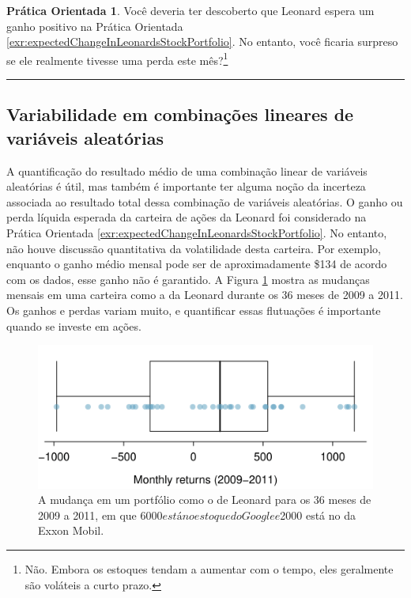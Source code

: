 \documentclass[
]{book}
\theoremstyle{definition}
\theoremstyle{definition}
\theoremstyle{definition}
\newtheorem{exercise}{Prática Orientada}[chapter]
\theoremstyle{definition}
\theoremstyle{remark}
\begin{document}
\begin{exercise}
\protect\hypertarget{exr:unnamed-chunk-80}{}{\label{exr:unnamed-chunk-80} }Você deveria ter descoberto que Leonard espera um ganho positivo na Prática Orientada \ref{exr:expectedChangeInLeonardsStockPortfolio}. No entanto, você ficaria surpreso se ele realmente tivesse uma perda este mês?\footnote{Não. Embora os estoques tendam a aumentar com o tempo, eles geralmente são voláteis a curto prazo.}
\end{exercise}

\begin{center}\rule{0.5\linewidth}{0.5pt}\end{center}

\hypertarget{variabilityLinearCombinationRandomVariables}{%
\subsection{Variabilidade em combinações lineares de variáveis aleatórias}\label{variabilityLinearCombinationRandomVariables}}

A quantificação do resultado médio de uma combinação linear de variáveis aleatórias é útil, mas também é importante ter alguma noção da incerteza associada ao resultado total dessa combinação de variáveis aleatórias. O ganho ou perda líquida esperada da carteira de ações da Leonard foi considerado na Prática Orientada \ref{exr:expectedChangeInLeonardsStockPortfolio}. No entanto, não houve discussão quantitativa da volatilidade desta carteira. Por exemplo, enquanto o ganho médio mensal pode ser de aproximadamente \$134 de acordo com os dados, esse ganho não é garantido. A Figura \ref{fig:changeInLeonardsStockPortfolioFor36Months} mostra as mudanças mensais em uma carteira como a da Leonard durante os 36 meses de 2009 a 2011. Os ganhos e perdas variam muito, e quantificar essas flutuações é importante quando se investe em ações.

\begin{figure}
\includegraphics[width=1\linewidth]{images/c2/changeInLeonardsStockPortfolioFor36Months} \caption{A mudança em um portfólio como o de Leonard para os 36 meses de 2009 a 2011, em que $6000 está no estoque do Google e $2000 está no da Exxon Mobil.}\label{fig:changeInLeonardsStockPortfolioFor36Months}
\end{figure}
\end{document}
